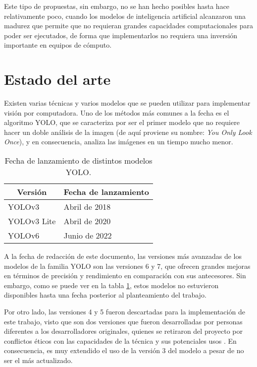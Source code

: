 Este tipo de propuestas, sin embargo, no se han hecho posibles hasta hace relativamente poco, cuando los modelos de inteligencia artificial alcanzaron una madurez que permite que no requieran grandes capacidades computacionales para poder ser ejecutados, de forma que implementarlos no requiera una inversión importante en equipos de cómputo.

\section{Estado del arte}

Existen varias técnicas y varios modelos que se pueden utilizar para implementar visión por computadora. Uno de los métodos más comunes a la fecha es el algoritmo YOLO, que se caracteriza por ser el primer modelo que no requiere hacer un doble análisis de la imagen \citep{1} (de aquí proviene su nombre: \textit{You Only Look Once}), y en consecuencia, analiza las imágenes en un tiempo mucho menor. 


\begin{table}[]
\centering
\caption{Fecha de lanzamiento de distintos modelos YOLO.}
\label{fechas-lanzamiento}
\begin{tabular}{@{}ll@{}}
\toprule
\multicolumn{1}{c}{\textbf{Versión}} & \multicolumn{1}{c}{\textbf{Fecha de lanzamiento}} \\ \midrule
YOLOv3                      & Abril de 2018                            \\
YOLOv3 Lite                 & Abril de 2020                            \\
YOLOv6                      & Junio de 2022                            \\ \bottomrule
\end{tabular}
\end{table}

A la fecha de redacción de este documento, las versiones más avanzadas de los modelos de la familia YOLO son las versiones 6 y 7, que ofrecen grandes mejoras en términos de precisión y rendimiento en comparación con sus antecesores. Sin embargo, como se puede ver en la tabla \ref{fechas-lanzamiento}, estos modelos no estuvieron disponibles hasta una fecha posterior al planteamiento del trabajo. 

Por otro lado, las versiones 4 y 5 fueron descartadas para la implementación de este trabajo, visto que son dos versiones que fueron desarrolladas por personas diferentes a los desarrolladores originales, quienes se retiraron del proyecto por conflictos éticos con las capacidades de la técnica y sus potenciales usos \cite{2}. En consecuencia, es muy extendido el uso de la versión 3 del modelo a pesar de no ser el más actualizado.

